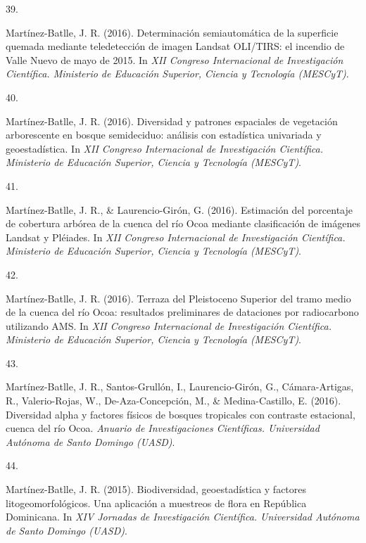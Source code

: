 \documentclass[10pt,a4paper,]{article}
\newlength{\cslhangindent}
\newlength{\csllabelwidth}
\newcommand{\CSLLeftMargin}[1]{\parbox[t]{\csllabelwidth}{\hfill #1~}}
\newcommand{\CSLRightInline}[1]{\parbox[t]{\linewidth - \cslhangindent - \csllabelwidth}{#1}\vspace{0.8ex}}
\begin{document}
\leavevmode\hypertarget{ref-Jose_Ramon_Martinez-Batlle_108041325}{}%
\CSLLeftMargin{39. }
\CSLRightInline{Martínez-Batlle, J. R. (2016). Determinación
semiautomática de la superficie quemada mediante teledetección de imagen
Landsat OLI/TIRS: el incendio de Valle Nuevo de mayo de 2015. In
\emph{XII Congreso Internacional de Investigación Científica. Ministerio
de Educación Superior, Ciencia y Tecnología (MESCyT)}.}

\leavevmode\hypertarget{ref-Jose_Ramon_Martinez-Batlle_108041498}{}%
\CSLLeftMargin{40. }
\CSLRightInline{Martínez-Batlle, J. R. (2016). Diversidad y patrones
espaciales de vegetación arborescente en bosque semideciduo: análisis
con estadística univariada y geoestadística. In \emph{XII Congreso
Internacional de Investigación Científica. Ministerio de Educación
Superior, Ciencia y Tecnología (MESCyT)}.}

\leavevmode\hypertarget{ref-Jose_Ramon_Martinez-Batlle_108010543}{}%
\CSLLeftMargin{41. }
\CSLRightInline{Martínez-Batlle, J. R., \& Laurencio-Girón, G. (2016).
Estimación del porcentaje de cobertura arbórea de la cuenca del río Ocoa
mediante clasificación de imágenes Landsat y Pléiades. In \emph{XII
Congreso Internacional de Investigación Científica. Ministerio de
Educación Superior, Ciencia y Tecnología (MESCyT)}.}

\leavevmode\hypertarget{ref-Jose_Ramon_Martinez-Batlle_108010605}{}%
\CSLLeftMargin{42. }
\CSLRightInline{Martínez-Batlle, J. R. (2016). Terraza del Pleistoceno
Superior del tramo medio de la cuenca del río Ocoa: resultados
preliminares de dataciones por radiocarbono utilizando AMS. In \emph{XII
Congreso Internacional de Investigación Científica. Ministerio de
Educación Superior, Ciencia y Tecnología (MESCyT)}.}

\leavevmode\hypertarget{ref-Jose_Ramon_Martinez-Batlle_76609746}{}%
\CSLLeftMargin{43. }
\CSLRightInline{Martínez-Batlle, J. R., Santos-Grullón, I.,
Laurencio-Girón, G., Cámara-Artigas, R., Valerio-Rojas, W.,
De-Aza-Concepción, M., \& Medina-Castillo, E. (2016). Diversidad alpha y
factores físicos de bosques tropicales con contraste estacional, cuenca
del río Ocoa. \emph{Anuario de Investigaciones Científicas. Universidad
Autónoma de Santo Domingo (UASD)}.}

\leavevmode\hypertarget{ref-Jose_Ramon_Martinez-Batlle_108041630}{}%
\CSLLeftMargin{44. }
\CSLRightInline{Martínez-Batlle, J. R. (2015). Biodiversidad,
geoestadística y factores litogeomorfológicos. Una aplicación a
muestreos de flora en República Dominicana. In \emph{XIV Jornadas de
Investigación Científica. Universidad Autónoma de Santo Domingo
(UASD)}.}
\end{document}
